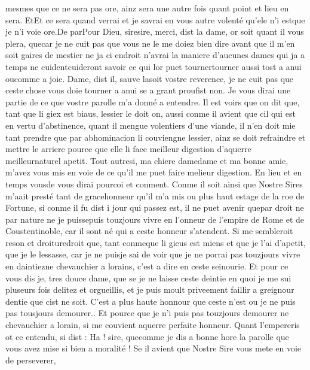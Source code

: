 \documentclass{article}
\begin{document}
\begin{pages}
      mesmes que ce ne sera pas ore, ainz sera une autre fois 
      quant point et lieu en sera. 
      EtEt ce sera quand verrai et je savrai en vous autre volenté 
      qu’ele n’i estque je n'i voie ore.De parPour Dieu, 
      siresire, merci, dist la dame, 
      or soit quant il vous plera, quecar je ne cuit pas que vous ne le me doiez bien dire
         avant que il m'en soit gaires de mestier ne ja ci endroit n’avrai la maniere d’aucunes dames qui ja a temps ne 
      cuidentcuideront 
      savoir ce qui lor puet tournertourner aussi tost a anui 
      oucomme a joie.
   Dame, dist il, sauve lasoit 
      vostre reverence, je ne cuit pas que ceste chose vous doie tourner a anui se a grant proufist non.
      Je vous dirai une partie de ce que vostre parolle m’a donné a entendre. Il est voirs que on dit que, tant que li giex est biaus, 
      lessier le doit on, aussi conme il avient que cil qui est en vertu d’abstinence, quant il mengue volentiers d’une viande, 
      il n’en doit mie tant prendre que par abhominacion li couviengne lessier, ainz se doit refraindre et mettre le arriere pource que 
      elle li face meilleur digestion d’aquerre 
         meilleurnaturel apetit.
      Tout autresi, ma chiere damedame et ma bonne amie, m’avez vous mis en voie 
      de ce qu’il me puet faire melieur digestion. En lieu et en temps 
      vousde vous dirai pourcoi 
      et conment. \pend
\pstart Conme il soit ainsi que Nostre Sires 
   m’aait presté tant de 
   gracehonneur qu’il m’a mis ou plus haut estage de la roe de Fortune, 
   si conme il fu dist i jour qui passez est, il ne puet avenir 
   quepar droit ne par nature ne je 
   puissepuis touzjours vivre en l’onneur de l’empire de 
   Rome et de Coustentinoble, car il sont né qui a ceste honneur 
   s’atendent. Si me sembleroit reson et droituredroit que, tant 
   conmeque li gieus 
   est miens et que je l’ai d’apetit, que je le lessasse, car je 
   ne puisje sai de voir que je ne porrai pas touzjours vivre 
   en daintiezne chevauchier a lorains, c'est a dire en ceste seinourie. 
   Et pour ce vous dis je, tres douce dame, que se je ne laisse ceste deintie en quoi je me sui pluseurs fois delitez et orgueillis,
   et je puis moult priveement faillir a greignour dentie que cist ne soit. C'est a plus haute honnour que ceste n'est ou je ne puis 
   pas tousjours demourer.. 
   Et pource que je n’i puis pas touzjours demourer ne chevauchier a lorain, si me couvient aquerre perfaite honneur.
   Quant l’empereris ot ce entendu, si dist :
   Ha ! sire, quecomme je dis a bonne hore 
      la parolle que vous avez mise si bien a moralité ! Se il avient que Nostre Sire vous mete en voie de perseverer, 

\end{pages}
\end{document}

